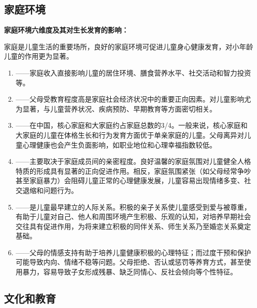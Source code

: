 \subsection{家庭环境}

\begin{keybox}
\textbf{家庭环境六维度及其对生长发育的影响：}

家庭是儿童生活的重要场所，良好的家庭环境可促进儿童身心健康发育，对小年龄儿童的作用更为显著。

\begin{enumerate}[leftmargin=*]
    \item {}——家庭收入直接影响儿童的居住环境、膳食营养水平、社交活动和智力投资等。

    \item {}——父母受教育程度高是家庭社会经济状况中的重要正向因素。对儿童影响尤为显著，与儿童营养状况、疾病预防、早期教育等方面密切相关。

    \item {}——在中国，核心家庭和大家庭约占家庭总数的3/4。一般来说，核心家庭和大家庭的儿童在体格生长和行为发育方面优于单亲家庭的儿童。父母离异对儿童心理健康也会产生负面影响，如职业地位和心理幸福指数较低。

    \item {}——主要取决于家庭成员间的亲密程度。良好温馨的家庭氛围对儿童健全人格特质的形成具有显著的正向促进作用。相反，家庭氛围紧张（如父母经常争吵甚至家庭暴力）会阻碍儿童正常的心理健康发展，儿童容易出现情绪多变、社交退缩和问题行为。

    \item {}——是儿童最早建立的人际关系。积极的亲子关系使儿童感受到爱与被尊重，有助于儿童对自己、他人和周围环境产生积极、乐观的认知，对培养早期社会交往具有促进作用，为将来建立积极的同伴关系、师生关系乃至婚恋关系奠定基础。

    \item {}——父母的情感支持有助于培养儿童健康积极的心理特征；而过度干预和保护可能导致内向、情绪不稳等问题。父母拒绝、否认或惩罚等养育方式，甚至使用暴力，容易导致子女形成残暴、缺乏同情心、反社会倾向等个性特征。
\end{enumerate}
\end{keybox}

\subsection{文化和教育}

